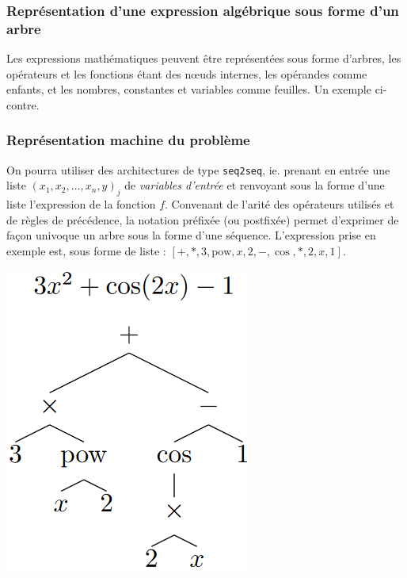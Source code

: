 \documentclass[a4paper,12pt]{article}
\begin{document}
\subsubsection{Représentation d'une expression algébrique sous forme d'un arbre}

\medskip
\noindent
\begin{minipage}{0.82\textwidth}
Les expressions mathématiques peuvent être représentées sous forme d'arbres, les opérateurs et les fonctions étant des nœuds internes, les opérandes comme enfants, et les nombres, constantes et variables comme feuilles. Un exemple ci-contre.

\subsubsection{Représentation machine du problème}

On pourra utiliser des architectures de type \texttt{seq2seq}, ie. prenant en entrée une liste $(x_1, x_2, ..., x_n, y)_j$ de \emph{variables d'entrée} et renvoyant sous la forme d'une liste l'expression de la fonction $f$. Convenant de l'arité des opérateurs utilisés et de règles de précédence, la notation préfixée (ou postfixée) permet d'exprimer de façon univoque un arbre sous la forme d'une séquence. L'expression prise en exemple est, sous forme de liste : $[+, *, 3, \text{pow}, x, 2, -, \cos, *, 2, x, 1]$.
\end{minipage}
\hfill
\begin{minipage}{=0.16\textwidth}
\includegraphics[width=\textwidth]{injectif.png}
\end{minipage}
\end{document}
